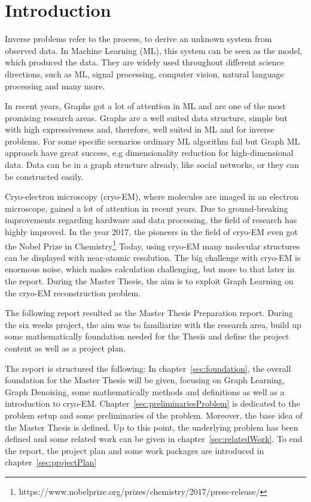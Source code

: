 \chapter{Introduction}
\label{sec:introduction}

Inverse problems refer to the process, to derive an unknown system from observed data.
In Machine Learning (ML), this system can be seen as the model, which produced the data.
They are widely used throughout different science directions, such as ML,
signal processing, computer vision, natural language processing and many more.

In recent years, Graphs got a lot of attention in ML and are one of the most promising research areas.
Graphs are a well suited data structure, simple but with high expressiveness 
and, therefore, well suited in ML and for inverse problems. For some specific scenarios
ordinary ML algorithm fail but Graph ML approach have great success, e.g dimensionality reduction for high-dimensional data.
Data can be in a graph structure already, like social networks, or they can be constructed easily.

Cryo-electron microscopy (cryo-EM), where molecules are imaged in an electron microscope,
gained a lot of attention in recent years. 
Due to ground-breaking improvements regarding hardware and data processing, the field of research
has highly improved. In the year 2017, the pioneers in the field of cryo-EM even got the 
Nobel Prize in Chemistry\footnote{https://www.nobelprize.org/prizes/chemistry/2017/press-release/}
Today, using cryo-EM many molecular structures can be displayed with near-atomic resolution.
The big challenge with cryo-EM is enormous noise, which makes calculation challenging, 
but more to that later in the report. During the Master Thesis, 
the aim is to exploit Graph Learning on the cryo-EM reconstruction problem.

\bigskip

The following report resulted as the Master Thesis Preparation report. During the six weeks project, 
the aim was to familiarize with the research area, build up some mathematically foundation needed 
for the Thesis and define the project content as well as a project plan.

\bigskip

The report is structured the following:
In chapter~\ref{sec:foundation}, the overall foundation for the Master Thesis will be given, focusing 
on Graph Learning, Graph Denoising, some mathematically methods and definitions as well as a 
introduction to cryo-EM.
Chapter~\ref{sec:preliminariesProblem} is dedicated to the problem setup and some preliminaries of the problem. 
Moreover, the base idea of the Master Thesis is defined.
Up to this point, the underlying problem has been defined and some related work can be given in chapter~\ref{sec:relatedWork}.
To end the report, the project plan and some work packages are introduced in chapter~\ref{sec:projectPlan}




